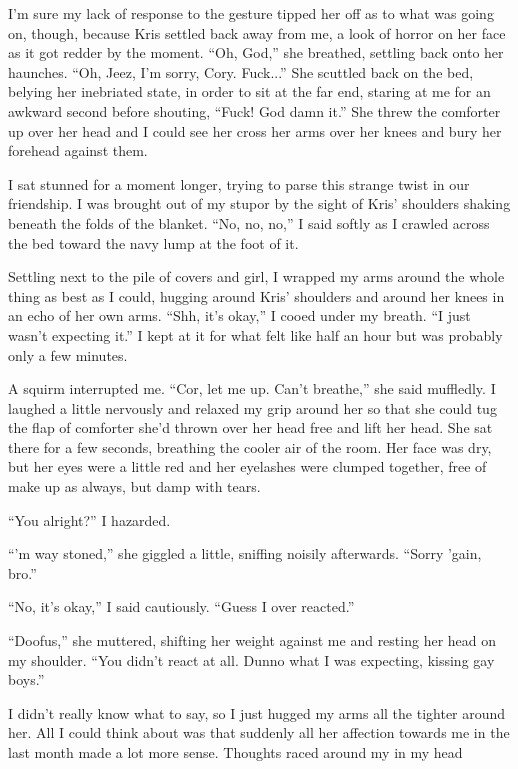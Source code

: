 I'm sure my lack of response to the gesture tipped her off as to what was going on, though, because Kris settled back away from me, a look of horror on her face as it got redder by the moment.  ``Oh, God,'' she breathed, settling back onto her haunches.  ``Oh, Jeez, I'm sorry, Cory.  Fuck...''  She scuttled back on the bed, belying her inebriated state, in order to sit at the far end, staring at me for an awkward second before shouting, ``Fuck!  God damn it.''  She threw the comforter up over her head and I could see her cross her arms over her knees and bury her forehead against them.

I sat stunned for a moment longer, trying to parse this strange twist in our friendship.  I was brought out of my stupor by the sight of Kris' shoulders shaking beneath the folds of the blanket.  ``No, no, no,'' I said softly as I crawled across the bed toward the navy lump at the foot of it.

Settling next to the pile of covers and girl, I wrapped my arms around the whole thing as best as I could, hugging around Kris' shoulders and around her knees in an echo of her own arms.  ``Shh, it's okay,'' I cooed under my breath.  ``I just wasn't expecting it.''  I kept at it for what felt like half an hour but was probably only a few minutes.

A squirm interrupted me.  ``Cor, let me up.  Can't breathe,'' she said muffledly.  I laughed a little nervously and relaxed my grip around her so that she could tug the flap of comforter she'd thrown over her head free and lift her head.  She sat there for a few seconds, breathing the cooler air of the room.  Her face was dry, but her eyes were a little red and her eyelashes were clumped together, free of make up as always, but damp with tears.

``You alright?'' I hazarded.

``'m way stoned,'' she giggled a little, sniffing noisily afterwards.  ``Sorry 'gain, bro.''

``No, it's okay,'' I said cautiously.  ``Guess I over reacted.''

``Doofus,'' she muttered, shifting her weight against me and resting her head on my shoulder.  ``You didn't react at all.  Dunno what I was expecting, kissing gay boys.''

I didn't really know what to say, so I just hugged my arms all the tighter around her.  All I could think about was that suddenly all her affection towards me in the last month made a lot more sense.  Thoughts raced around my in my head

